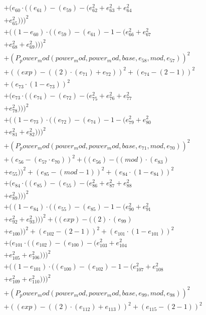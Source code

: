 \documentclass[10pt, a4paper]{article}
\begin{document}
\begin{small}
\begin{align*}
& + (e_{60}  \cdot  ((e_{61}) - (e_{59}) - (e_{62}^{2} + e_{63}^{2} + e_{64}^{2} \\
& + e_{65}^{2})))^{2} \\
& + ((1 - e_{60})  \cdot  ((e_{59}) - (e_{61}) - 1 - (e_{66}^{2} + e_{67}^{2} \\
& + e_{68}^{2} + e_{69}^{2})))^{2} \\
& + (P_power_mod(power_mod, power_mod, base, e_{58}, mod, e_{57}))^{2} \\
& + ((exp) - ((2)  \cdot  (e_{71}) + e_{72}))^{2} + (e_{74} - (2 - 1))^{2} \\
& + (e_{73}  \cdot  (1 - e_{73}))^{2} \\
& + (e_{73}  \cdot  ((e_{74}) - (e_{72}) - (e_{75}^{2} + e_{76}^{2} + e_{77}^{2} \\
& + e_{78}^{2})))^{2} \\
& + ((1 - e_{73})  \cdot  ((e_{72}) - (e_{74}) - 1 - (e_{79}^{2} + e_{80}^{2} \\
& + e_{81}^{2} + e_{82}^{2})))^{2} \\
& + (P_power_mod(power_mod, power_mod, base, e_{71}, mod, e_{70}))^{2} \\
& + (e_{56} - (e_{57}  \cdot  e_{70}))^{2} + ((e_{56}) - ((mod)  \cdot  (e_{83}) \\
& + e_{55}))^{2} + (e_{85} - (mod - 1))^{2} + (e_{84}  \cdot  (1 - e_{84}))^{2} \\
& + (e_{84}  \cdot  ((e_{85}) - (e_{55}) - (e_{86}^{2} + e_{87}^{2} + e_{88}^{2} \\
& + e_{89}^{2})))^{2} \\
& + ((1 - e_{84})  \cdot  ((e_{55}) - (e_{85}) - 1 - (e_{90}^{2} + e_{91}^{2} \\
& + e_{92}^{2} + e_{93}^{2})))^{2} + ((exp) - ((2)  \cdot  (e_{99}) \\
& + e_{100}))^{2} + (e_{102} - (2 - 1))^{2} + (e_{101}  \cdot  (1 - e_{101}))^{2} \\
& + (e_{101}  \cdot  ((e_{102}) - (e_{100}) - (e_{103}^{2} + e_{104}^{2} \\
& + e_{105}^{2} + e_{106}^{2})))^{2} \\
& + ((1 - e_{101})  \cdot  ((e_{100}) - (e_{102}) - 1 - (e_{107}^{2} + e_{108}^{2} \\
& + e_{109}^{2} + e_{110}^{2})))^{2} \\
& + (P_power_mod(power_mod, power_mod, base, e_{99}, mod, e_{98}))^{2} \\
& + ((exp) - ((2)  \cdot  (e_{112}) + e_{113}))^{2} + (e_{115} - (2 - 1))^{2} \\

\end{align*}
\end{small}
\end{document}
